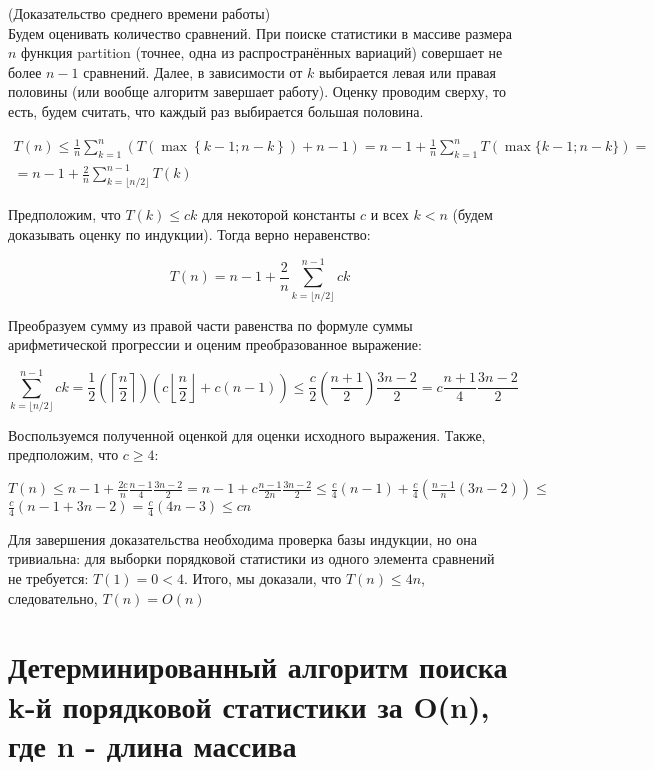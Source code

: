 \parbox[t]{0.95\linewidth}{
    (Доказательство среднего времени работы)
    \\
    Будем оценивать количество сравнений. При поиске статистики в массиве размера $n$ функция partition (точнее, одна из распространённых вариаций) совершает не более $n - 1$ сравнений. Далее, в зависимости от $k$ выбирается левая или правая половины (или вообще алгоритм завершает работу). Оценку проводим сверху, то есть, будем считать, что каждый раз выбирается большая половина.

    $$\begin{gathered}
    T(n) \le \frac 1n \sum\limits_{k = 1}^n \left ( T \left ( \max \left \{k - 1; n - k \right \} \right ) + n - 1 \right ) = n - 1 + \frac 1n \sum\limits_{k = 1}^n T(\max \{k - 1; n - k\}) = \\ = n - 1 + \frac 2n \sum\limits_{k = \lfloor n/2 \rfloor}^{n - 1} T(k)
    \end{gathered}$$
    
    Предположим, что $T(k) \le ck$ для некоторой константы $c$ и всех $k < n$ (будем доказывать оценку по индукции). Тогда верно неравенство:
    
    $$T(n) = n - 1 + \frac 2n \sum\limits_{k = \lfloor n/2 \rfloor}^{n - 1} ck$$
    
    Преобразуем сумму из правой части равенства по формуле суммы арифметической прогрессии и оценим преобразованное выражение:
}

\parbox[t]{0.95\linewidth}{
    $$\sum\limits_{k = \lfloor n/2 \rfloor}^{n - 1} ck = \frac 12 \left(\left \lceil \frac n2 \right \rceil  \right) \left( c \left \lfloor \frac n2 \right \rfloor + c(n - 1) \right) \le \frac c2 \left(\frac{n + 1}2 \right) \frac{3n - 2}2 = c \frac{n + 1}4 \frac{3n - 2}2$$
    
    Воспользуемся полученной оценкой для оценки исходного выражения. Также, предположим, что $c \ge 4$:
    
    $T(n) \le n - 1 + \frac{2c}n \frac{n - 1}4 \frac{3n - 2}2 = n - 1 + c\frac{n - 1}{2n} \frac{3n - 2}2 \le \frac c4 (n - 1) + \frac c4\left(\frac{n - 1}n (3n - 2)\right) \le$
    $\frac c4 (n - 1 + 3n - 2) = \frac c4 (4n - 3) \le cn$
    
    Для завершения доказательства необходима проверка базы индукции, но она тривиальна: для выборки порядковой статистики из одного элемента сравнений не требуется: $T(1) = 0 < 4$. Итого, мы доказали, что $T(n) \le 4n$, следовательно, $T(n) = O(n)$
}

\setcounter{section}{17}
\section{Детерминированный алгоритм поиска k-й порядковой статистики за O(n), где n - длина массива}

